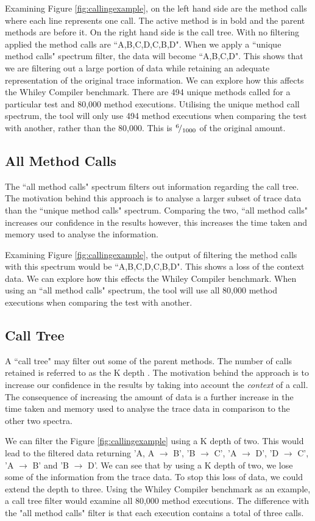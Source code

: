 Examining Figure \ref{fig:callingexample}, on the left hand side are the method calls where each line represents one call. The active method is in bold and the parent methods are before it. On the right hand side is the call tree. With no filtering applied the method calls are ``A,B,C,D,C,B,D". When we apply a ``unique method calls" spectrum filter, the data will become ``A,B,C,D". This shows that we are filtering out a large portion of data while retaining an adequate representation of the original trace information. We can explore how this affects the Whiley Compiler benchmark. There are 494 unique methods called for a particular test and 80,000 method executions. Utilising the unique method call spectrum, the tool will only use 494 method executions when comparing the test with another, rather than the 80,000. This is ${}^{6}\!/_{1000}$ of the original amount. 

\subsection{All Method Calls}
The ``all method calls" spectrum filters out information regarding the call tree. The motivation behind this approach is to analyse a larger subset of trace data than the ``unique method calls" spectrum. Comparing the two, ``all method calls" increases our confidence in the results however, this increases the time taken and memory used to analyse the information.

Examining Figure \ref{fig:callingexample}, the output of filtering the method calls with this spectrum would be ``A,B,C,D,C,B,D". This shows a loss of the context data. We can explore how this effects the Whiley Compiler benchmark. When using an ``all method calls" spectrum, the tool will use all 80,000 method executions when comparing the test with another.

\subsection{Call Tree}
A ``call tree" may filter out some of the parent methods. The number of calls retained is referred to as the K depth \cite{Zhuang06accurate}. The motivation behind the approach is to increase our confidence in the results by taking into account the \textit{context} of a call. The consequence of increasing the amount of data is a further increase in the time taken and memory used to analyse the trace data in comparison to the other two spectra.

We can filter the Figure \ref{fig:callingexample} using a K depth of two. This would lead to the filtered data returning 'A, A $\rightarrow$ B', 'B $\rightarrow$ C', 'A $\rightarrow$ D', 'D $\rightarrow$ C', 'A $\rightarrow$ B' and 'B $\rightarrow$ D'. We can see that by using a K depth of two, we lose some of the information from the trace data. To stop this loss of data, we could extend the depth to three. Using the Whiley Compiler benchmark as an example, a call tree filter would examine all 80,000 method executions. The difference with the "all method calls" filter is that each execution contains a total of three calls.

